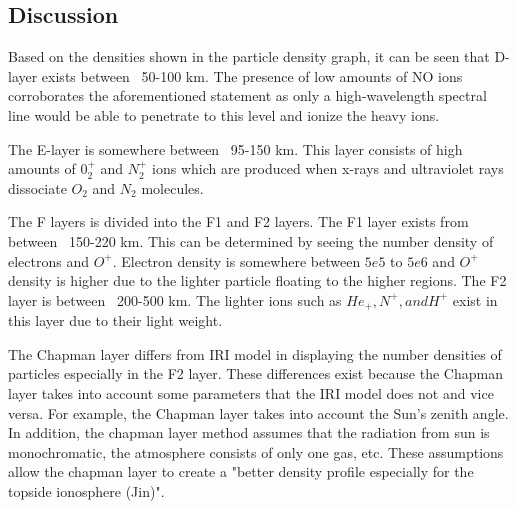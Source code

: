 		\subsection{Discussion}
		Based on the densities shown in the particle density graph, it can be seen that D-layer exists between ~50-100 km. The presence of low amounts of NO ions corroborates the aforementioned statement as only a high-wavelength spectral line would be able to penetrate to this level and ionize the heavy ions. 
		\par
		The E-layer is somewhere between ~95-150 km. This layer consists of high amounts of $0_2^+$ and $N_2^+$ ions which are produced when x-rays and ultraviolet rays dissociate $O_2$ and $N_2$ molecules.
		\par
		The F layers is divided into the F1 and F2 layers. The F1 layer exists from between ~150-220 km. This can be determined by seeing the number density of electrons and $O^+$. Electron density is somewhere between $5e5$ to $5e6$ and $O^+$ density is higher due to the lighter particle floating to the higher regions. The F2 layer is between ~200-500 km. The lighter ions such as $He_+, N^+, and H^+$  exist in this layer due to their light weight.
		\par
		The Chapman layer differs from IRI model in displaying the number densities of particles especially in the F2 layer. These differences exist because the Chapman layer takes into account some parameters that the IRI model does not and vice versa. For example, the Chapman layer takes into account the Sun's zenith angle. In addition, the chapman layer method assumes that the radiation from sun is monochromatic, the atmosphere consists of only one gas, etc. These assumptions allow the chapman layer to create a "better density profile especially for the topside ionosphere (Jin)".






%
%
%
%

